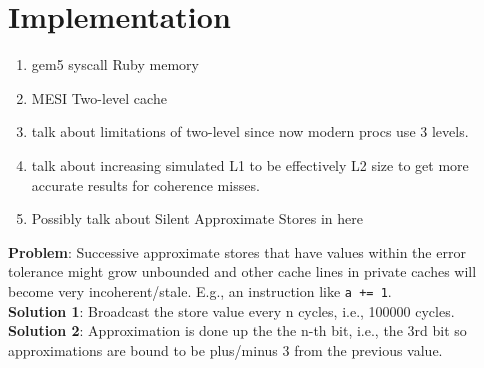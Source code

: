 \section{Implementation}
\begin{enumerate}
	\item gem5 syscall Ruby memory
	\item MESI Two-level cache
	\item talk about limitations of two-level since now modern procs use 3 levels.
	\item talk about increasing simulated L1 to be effectively L2 size to get more accurate results for coherence misses.
	\item Possibly talk about Silent Approximate Stores in here
\end{enumerate}

\textbf{Problem}: Successive approximate stores that have values within the error tolerance might grow unbounded and other cache lines in private caches will become very incoherent/stale. E.g., an instruction like \texttt{a += 1}.\\
\textbf{Solution 1}: Broadcast the store value every n cycles, i.e., 100000 cycles.\\
\textbf{Solution 2}: Approximation is done up the the n-th bit, i.e., the 3rd bit so approximations are bound to be plus/minus 3 from the previous value.
